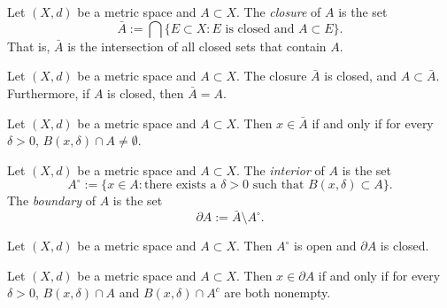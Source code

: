 \documentclass[../main.tex]{subfiles}
\begin{document}
        \begin{definition} \label{def:closure}
        Let \( (X, d) \) be a metric space and \( A \subset X \). The \textit{closure} of \( A \) is the set
        \[
        \bar{A} := \bigcap \{E \subset X : E \text{ is closed and } A \subset E\}.
        \]
        That is, \( \bar{A} \) is the intersection of all closed sets that contain \( A \).
        \end{definition}
        
        \begin{proposition} \label{prop:closure_properties}
        Let \( (X, d) \) be a metric space and \( A \subset X \). The closure \( \bar{A} \) is closed, and \( A \subset \bar{A} \). Furthermore, if \( A \) is closed, then \( \bar{A} = A \).
        \end{proposition}
        
        \begin{proposition} \label{prop:closure_characterization}
        Let \( (X, d) \) be a metric space and \( A \subset X \). Then \( x \in \bar{A} \) if and only if for every \( \delta > 0 \), \( B(x, \delta) \cap A \neq \emptyset \).
        \end{proposition}
        
        \begin{definition} \label{def:interior_boundary}
        Let \( (X, d) \) be a metric space and \( A \subset X \). The \textit{interior} of \( A \) is the set
        \[
        A^{\circ} := \{ x \in A : \text{there exists a } \delta > 0 \text{ such that } B(x, \delta) \subset A \}.
        \]
        The \textit{boundary} of \( A \) is the set
        \[
        \partial A := \bar{A} \setminus A^{\circ}.
        \]
        \end{definition}
        
        \begin{proposition} \label{prop:interior_boundary}
        Let \( (X, d) \) be a metric space and \( A \subset X \). Then \( A^{\circ} \) is open and \( \partial A \) is closed.
        \end{proposition}
        
        \begin{proposition} \label{prop:boundary_characterization}
        Let \( (X, d) \) be a metric space and \( A \subset X \). Then \( x \in \partial A \) if and only if for every \( \delta > 0 \), \( B(x, \delta) \cap A \) and \( B(x, \delta) \cap A^c \) are both nonempty.
        \end{proposition}
        
\end{document}
